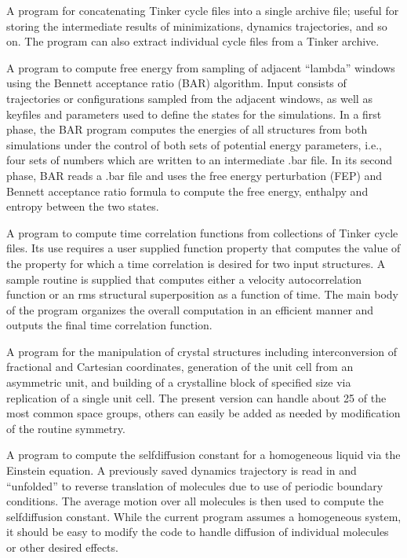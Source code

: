 \documentclass[letterpaper,11pt,english]{sphinxmanual}
\begin{document}

A program for concatenating Tinker cycle files into a single archive file; useful for storing the intermediate results of minimizations, dynamics trajectories, and so on. The program can also extract individual cycle files from a Tinker archive.


A program to compute free energy from sampling of adjacent “lambda” windows using the Bennett acceptance ratio (BAR) algorithm. Input consists of trajectories or configurations sampled from the adjacent windows, as well as keyfiles and parameters used to define the states for the simulations. In a first phase, the BAR program computes the energies of all structures from both simulations under the control of both sets of potential energy parameters, i.e., four sets of numbers which are written to an intermediate .bar file. In its second phase, BAR reads a .bar file and uses the free energy perturbation (FEP) and Bennett acceptance ratio formula to compute the free energy, enthalpy and entropy between the two states.


A program to compute time correlation functions from collections of Tinker cycle files. Its use requires a user supplied function property that computes the value of the property for which a time correlation is desired for two input structures. A sample routine is supplied that computes either a velocity autocorrelation function or an rms structural superposition as a function of time. The main body of the program organizes the overall computation in an efficient manner and outputs the final time correlation function.


A program for the manipulation of crystal structures including interconversion of fractional and Cartesian coordinates, generation of the unit cell from an asymmetric unit, and building of a crystalline block of specified size via replication of a single unit cell. The present version can handle about 25 of the most common space groups, others can easily be added as needed by modification of the routine symmetry.


A program to compute the self\sphinxhyphen{}diffusion constant for a homogeneous liquid via the Einstein equation. A previously saved dynamics trajectory is read in and “unfolded” to reverse translation of molecules due to use of periodic boundary conditions. The average motion over all molecules is then used to compute the self\sphinxhyphen{}diffusion constant. While the current program assumes a homogeneous system, it should be easy to modify the code to handle diffusion of individual molecules or other desired effects.
\end{document}
